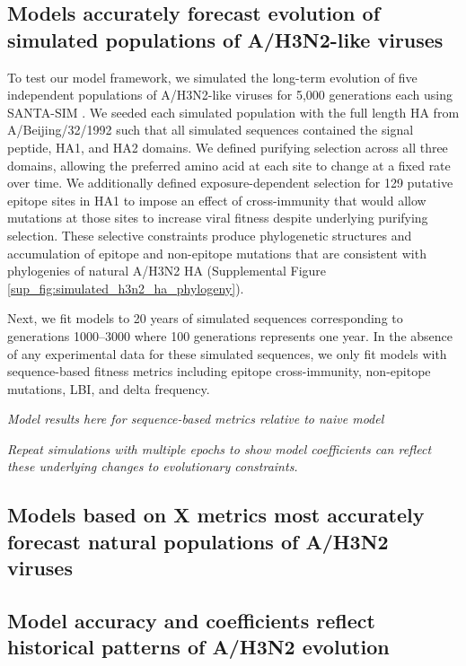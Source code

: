 \subsection*{Models accurately forecast evolution of simulated populations of A/H3N2-like viruses}

To test our model framework, we simulated the long-term evolution of five independent populations of A/H3N2-like viruses for 5,000 generations each using SANTA-SIM \cite{Jariani2019}.
We seeded each simulated population with the full length HA from A/Beijing/32/1992 such that all simulated sequences contained the signal peptide, HA1, and HA2 domains.
We defined purifying selection across all three domains, allowing the preferred amino acid at each site to change at a fixed rate over time.
We additionally defined exposure-dependent selection for 129 putative epitope sites in HA1 \cite{Wolf:2006da} to impose an effect of cross-immunity that would allow mutations at those sites to increase viral fitness despite underlying purifying selection.
These selective constraints produce phylogenetic structures and accumulation of epitope and non-epitope mutations that are consistent with phylogenies of natural A/H3N2 HA (Supplemental Figure \ref{sup_fig:simulated_h3n2_ha_phylogeny}).

Next, we fit models to 20 years of simulated sequences corresponding to generations 1000--3000 where 100 generations represents one year.
In the absence of any experimental data for these simulated sequences, we only fit models with sequence-based fitness metrics including epitope cross-immunity, non-epitope mutations, LBI, and delta frequency.

\textit{Model results here for sequence-based metrics relative to naive model}

\textit{Repeat simulations with multiple epochs to show model coefficients can reflect these underlying changes to evolutionary constraints.}

\subsection*{Models based on X metrics most accurately forecast natural populations of A/H3N2 viruses}

\subsection*{Model accuracy and coefficients reflect historical patterns of A/H3N2 evolution}

